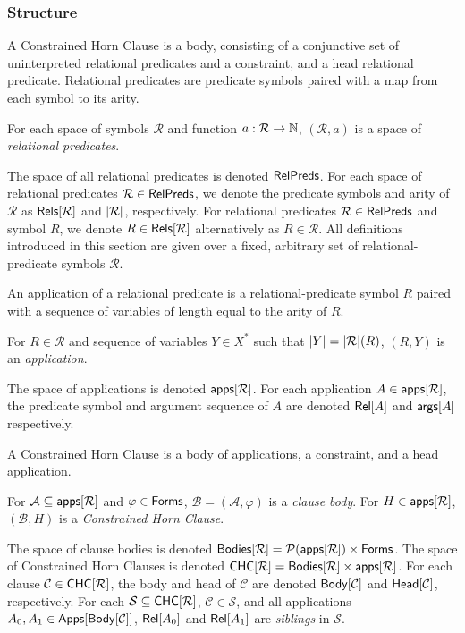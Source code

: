 \subsubsection{Structure}
A Constrained Horn Clause is a body, consisting of a conjunctive set
of uninterpreted relational predicates and a constraint, and a head
relational predicate.
%
Relational predicates are predicate symbols paired with a map from
each symbol to its arity.
%
\begin{defn}
  \label{defn:rel-preds}
  For each space of symbols $\mathcal{R}$ and function $a: \mathcal{R}
  \to \mathbb{N}$, $(\mathcal{R}, a)$ is a space of \emph{relational
    predicates}.
\end{defn}
%
The space of all relational predicates is denoted $\mathsf{RelPreds}$.
%
For each space of relational predicates $\mathcal{R} \in \mathsf{RelPreds}$,
we denote the predicate symbols and arity of $\mathcal{R}$ as
$\mathsf{Rels}[ \mathcal{R} ]$ and $|\mathcal{R}|$, respectively.
%
For relational predicates $\mathcal{R} \in \mathsf{RelPreds}$ and symbol $R$,
we denote $R \in \mathsf{Rels}[  \mathcal{R}  ]$ alternatively as $R \in
\mathcal{R}$.
%
All definitions introduced in this section are given over a fixed,
arbitrary set of relational-predicate symbols $\mathcal{R}$.

An application of a relational predicate is a relational-predicate
symbol $R$ paired with a sequence of variables of length equal to the
arity of $R$.
%
\begin{defn}
  \label{defn:pred-apps}
  For $R \in \mathcal{R}$ and sequence of variables $Y \in X^{*}$ such
  that $|Y| = |\mathcal{R}|(R)$, $(R, Y)$ is an
  \emph{application}.
\end{defn}
%
The space of applications is denoted $\mathsf{apps}[ \mathcal{R} ]$.
%
For each application $A \in \mathsf{apps}[ \mathcal{R} ]$, the predicate symbol
and argument sequence of $A$ are denoted $\mathsf{Rel}[ A ]$ and $\mathsf{args}[ A ]$
respectively.

A Constrained Horn Clause is a body of applications, a constraint, and
a head application.
%
\begin{defn}
  \label{defn:chcs-structure}
  For $\mathcal{A} \subseteq \mathsf{apps}[ \mathcal{R} ]$ and %
  $\varphi \in \mathsf{Forms}$, $\mathcal{B} = (\mathcal{A}, \varphi)$ is a
  \emph{clause body}.
  For $H \in \mathsf{apps}[ \mathcal{R} ]$, $(\mathcal{B}, H)$ is a
  \emph{Constrained Horn Clause}.
\end{defn}
The space of clause bodies is denoted $\mathsf{Bodies}[  \mathcal{R}  ] =
\mathcal{P}(\mathsf{apps}[ \mathcal{R} ]) \times \mathsf{Forms}$.
The space of Constrained Horn Clauses is denoted $\mathsf{CHC}[ \mathcal{R} ] =
\mathsf{Bodies}[  \mathcal{R}  ] \times \mathsf{apps}[ \mathcal{R} ]$.
%
For each clause $\mathcal{C} \in \mathsf{CHC}[ \mathcal{R} ]$, the body and head
of $\mathcal{C}$ are denoted $\mathsf{Body}[  \mathcal{C}  ]$ and $\mathsf{Head}[ 
  \mathcal{C}  ]$, respectively.
For each $\mathcal{S} \subseteq \mathsf{CHC}[  \mathcal{R}  ]$, $\mathcal{C} \in
\mathcal{S}$, and all applications $A_0, A_1 \in \mathsf{Apps}[  \mathsf{Body}[ 
    \mathcal{C}  ]  ]$, $\mathsf{Rel}[ A_0 ]$ and $\mathsf{Rel}[ A_1 ]$ are
\emph{siblings} in $\mathcal{S}$.

